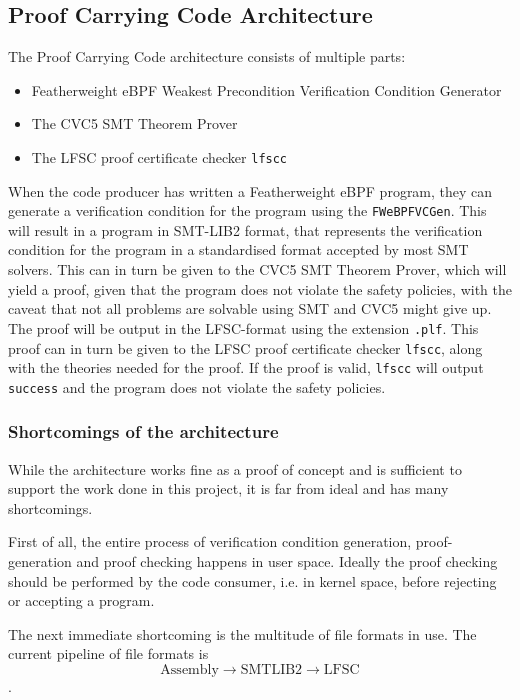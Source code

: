 \subsection{Proof Carrying Code Architecture}
\label{subsec:pcc_architecture}

The Proof Carrying Code architecture consists of multiple parts:


\begin{itemize}
\item Featherweight eBPF Weakest Precondition Verification Condition Generator
\item The CVC5 SMT Theorem Prover\cite{gh:cvc5}
\item The LFSC proof certificate checker \texttt{lfscc}\cite{gh:lfsc}
\end{itemize}

When the code producer has written a Featherweight eBPF program, they can generate a verification condition for the program using the \texttt{FWeBPFVCGen}. This will result in a program in SMT-LIB2 format, that represents the verification condition for the program in a standardised format accepted by most SMT solvers.
This can in turn be given to the CVC5 SMT Theorem Prover, which will yield a proof, given that the program does not violate the safety policies, with the caveat that not all problems are solvable using SMT and CVC5 might give up.
The proof will be output in the LFSC-format using the extension \texttt{.plf}.
This proof can in turn be given to the LFSC proof certificate checker \texttt{lfscc}, along with the theories needed for the proof. If the proof is valid, \texttt{lfscc} will output \verb!success! and the program does not violate the safety policies. 




\subsubsection{Shortcomings of the architecture}

While the architecture works fine as a proof of concept and is sufficient to support the work done in this project, it is far from ideal and has many shortcomings.

First of all, the entire process of verification condition generation, proof-generation and proof checking happens in user space. Ideally the proof checking should be performed by the code consumer, i.e. in kernel space, before rejecting or accepting a program. 

The next immediate shortcoming is the multitude of file formats in use. The current pipeline of file formats is $$\mathrm{Assembly} \rightarrow \mathrm{SMTLIB2} \rightarrow \mathrm{LFSC}$$. 

